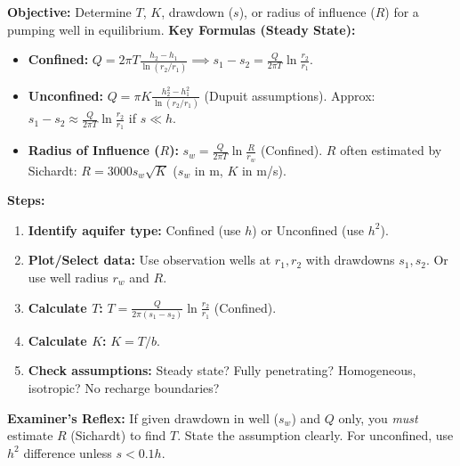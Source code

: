 \documentclass[11pt]{article}
\begin{document}
\begin{methode}
\textbf{Objective:} Determine $T$, $K$, drawdown ($s$), or radius of influence ($R$) for a pumping well in equilibrium.
\textbf{Key Formulas (Steady State):}
\begin{itemize}
    \item \textbf{Confined:} $Q = 2\pi T \frac{h_2 - h_1}{\ln(r_2/r_1)} \implies s_1 - s_2 = \frac{Q}{2\pi T} \ln\frac{r_2}{r_1}$.
    \item \textbf{Unconfined:} $Q = \pi K \frac{h_2^2 - h_1^2}{\ln(r_2/r_1)}$ (Dupuit assumptions). Approx: $s_1 - s_2 \approx \frac{Q}{2\pi T} \ln\frac{r_2}{r_1}$ if $s \ll h$.
    \item \textbf{Radius of Influence ($R$):} $s_w = \frac{Q}{2\pi T} \ln\frac{R}{r_w}$ (Confined). $R$ often estimated by Sichardt: $R = 3000 s_w \sqrt{K}$ ($s_w$ in m, $K$ in m/s).
\end{itemize}
\textbf{Steps:}
\begin{enumerate}
    \item \textbf{Identify aquifer type:} Confined (use $h$) or Unconfined (use $h^2$).
    \item \textbf{Plot/Select data:} Use observation wells at $r_1, r_2$ with drawdowns $s_1, s_2$. Or use well radius $r_w$ and $R$.
    \item \textbf{Calculate $T$:} $T = \frac{Q}{2\pi (s_1 - s_2)} \ln\frac{r_2}{r_1}$ (Confined).
    \item \textbf{Calculate $K$:} $K = T / b$.
    \item \textbf{Check assumptions:} Steady state? Fully penetrating? Homogeneous, isotropic? No recharge boundaries?
\end{enumerate}
\textbf{Examiner's Reflex:} If given drawdown in well ($s_w$) and $Q$ only, you \emph{must} estimate $R$ (Sichardt) to find $T$. State the assumption clearly. For unconfined, use $h^2$ difference unless $s < 0.1 h$.
\end{methode}
\end{document}
